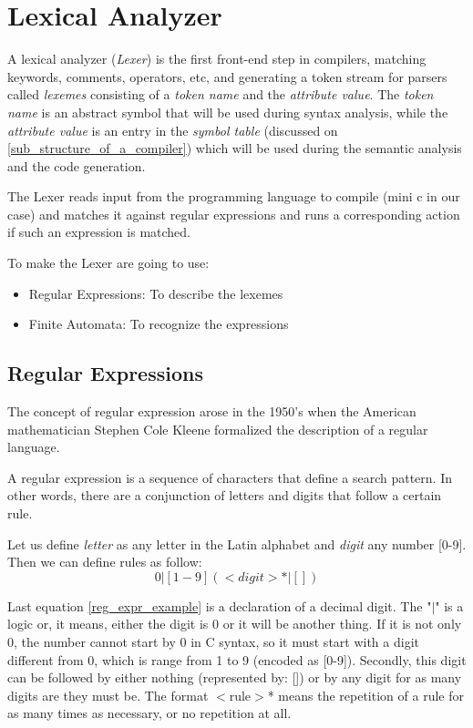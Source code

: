 \documentclass[conference]{IEEEtran}
\begin{document}
\section{Lexical Analyzer} \label{sec:lexical-Analizer}
A lexical analyzer (\textit{Lexer}) is the first front-end step in compilers, matching keywords, comments, operators, etc, and generating a token stream for parsers called \textit{lexemes} consisting of a \textit{token name} and the \textit{attribute value}. 
The \textit{token name} is an abstract symbol that will be used during syntax analysis, while the \textit{attribute value} is an entry in the \textit{symbol table} (discussed on \ref{sub_structure_of_a_compiler}) which will be used during the semantic analysis and the code generation.

The Lexer reads input from the programming language to compile (mini c in our case) and matches it against regular expressions and runs a corresponding action if such an expression is matched.

To make the Lexer are going to use:
\begin{itemize}
	\item Regular Expressions: To describe the lexemes
	\item Finite Automata: To recognize the expressions
\end{itemize}
\subsection{Regular Expressions}
The concept of regular expression arose in the 1950's when the American mathematician Stephen Cole Kleene formalized the description of a regular language.

A regular expression is a sequence of characters that define a search pattern. In other words, there are a conjunction of letters and digits that follow a certain rule.

Let us define \textit{letter} as any letter in the Latin alphabet and \textit{digit} any number [0-9]. Then we can define rules as follow: 
\begin{equation}
0 | [1-9] (<digit>* | [])\label{reg_expr_example}
\end{equation}

Last equation \ref{reg_expr_example} is a declaration of a decimal digit. The "$|$" is a logic or, it means, either the digit is 0 or it will be another thing. If it is not only 0, the number cannot start by 0 in C syntax, so it must start with a digit different from 0, which is range from 1 to 9 (encoded as [0-9]). Secondly, this digit can be followed by either nothing (represented by: []) or by any digit for as many digits are they must be. The format $<$rule$>$* means the repetition of a rule for as many times as necessary, or no repetition at all.
\end{document}
